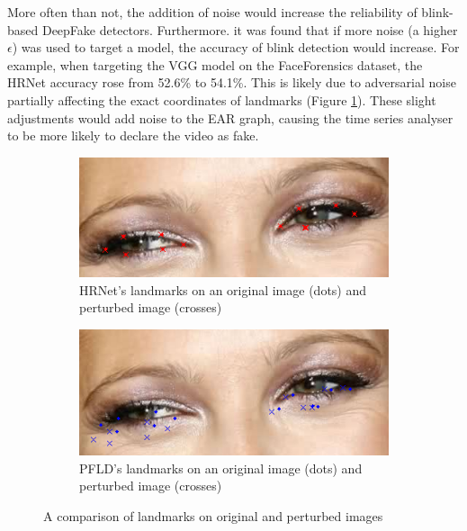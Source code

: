 More often than not, the addition of noise would increase the reliability of blink-based DeepFake detectors. Furthermore. it was found that if more noise (a higher $\epsilon$) was used to target a model, the accuracy of blink detection would increase. For example, when targeting the VGG model on the FaceForensics dataset, the HRNet accuracy rose from 52.6\% to 54.1\%. This is likely due to adversarial noise partially affecting the exact coordinates of landmarks (Figure \ref{fig:landmarks-noise}). These slight adjustments would add noise to the EAR graph, causing the time series analyser to be more likely to declare the video as fake.

\begin{figure}[H]
    \centering
    \begin{subfigure}{0.45\linewidth}
        \includegraphics[width=\linewidth]{dissertation//figures/noisy-frame-hrnet.png}
        \caption{HRNet's landmarks on an original image (dots) and perturbed image (crosses)}
    \end{subfigure}
    \begin{subfigure}{0.45\linewidth}
        \includegraphics[width=\linewidth]{dissertation//figures/noisy-frame-pfld.png}
        \caption{PFLD's landmarks on an original image (dots) and perturbed image (crosses)}
    \end{subfigure}
    \caption{A comparison of landmarks on original and perturbed images}
    \label{fig:landmarks-noise}
\end{figure}

